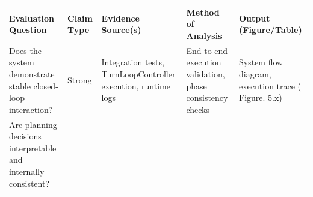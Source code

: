 {\def\LTcaptype{none} %
\begin{longtable}[]{@{}
  >{\raggedright\arraybackslash}p{}
  >{\raggedright\arraybackslash}p{}
  >{\raggedright\arraybackslash}p{}
  >{\raggedright\arraybackslash}p{}
  >{\raggedright\arraybackslash}p{}@{}}
\toprule\noalign{}
\begin{minipage}[b]{\linewidth}\centering
\textbf{Evaluation Question}
\end{minipage} & \begin{minipage}[b]{\linewidth}\centering
\textbf{Claim Type}
\end{minipage} & \begin{minipage}[b]{\linewidth}\centering
\textbf{Evidence Source(s)}
\end{minipage} & \begin{minipage}[b]{\linewidth}\centering
\textbf{Method of Analysis}
\end{minipage} & \begin{minipage}[b]{\linewidth}\centering
\textbf{Output (Figure/Table)}
\end{minipage} \\
\begin{minipage}[b]{\linewidth}\raggedright
Does the system demonstrate stable closed-loop interaction?
\end{minipage} & \begin{minipage}[b]{\linewidth}\raggedright
Strong
\end{minipage} & \begin{minipage}[b]{\linewidth}\raggedright
Integration tests, TurnLoopController execution, runtime logs
\end{minipage} & \begin{minipage}[b]{\linewidth}\raggedright
End-to-end execution validation, phase consistency checks
\end{minipage} & \begin{minipage}[b]{\linewidth}\raggedright
System flow diagram, execution trace ( Figure. 5.x)
\end{minipage} \\
\begin{minipage}[b]{\linewidth}\raggedright
Are planning decisions interpretable and internally consistent?
\end{minipage} & \begin{minipage}[b]{\linewidth}\raggedright

\end{minipage}
\end{longtable}}

